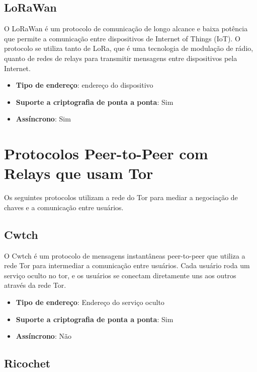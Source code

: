 \subsection{LoRaWan}

O LoRaWan é um protocolo de comunicação de longo alcance e baixa potência que permite a comunicação entre dispositivos de Internet of Things (IoT). O protocolo se utiliza tanto de LoRa, que é uma tecnologia de modulação de rádio, quanto de redes de relays para transmitir mensagens entre dispositivos pela Internet. \cite{lorawan}

\begin{itemize}
  \item \textbf{Tipo de endereço}: endereço do dispositivo
  \item \textbf{Suporte a criptografia de ponta a ponta}: Sim
  \item \textbf{Assíncrono}: Sim
\end{itemize}

\section{Protocolos Peer-to-Peer com Relays que usam Tor}

Os seguintes protocolos utilizam a rede do Tor para mediar a negociação de chaves e a comunicação entre usuários.

\subsection{Cwtch}

O Cwtch é um protocolo de mensagens instantâneas peer-to-peer que utiliza a rede Tor para intermediar a comunicação entre usuários. Cada usuário roda um serviço oculto no tor, e os usuários se conectam diretamente uns aos outros através da rede Tor. \cite{cwtch}

\begin{itemize}
  \item \textbf{Tipo de endereço}: Endereço do serviço oculto
  \item \textbf{Suporte a criptografia de ponta a ponta}: Sim
  \item \textbf{Assíncrono}: Não
\end{itemize}

\subsection{Ricochet}

